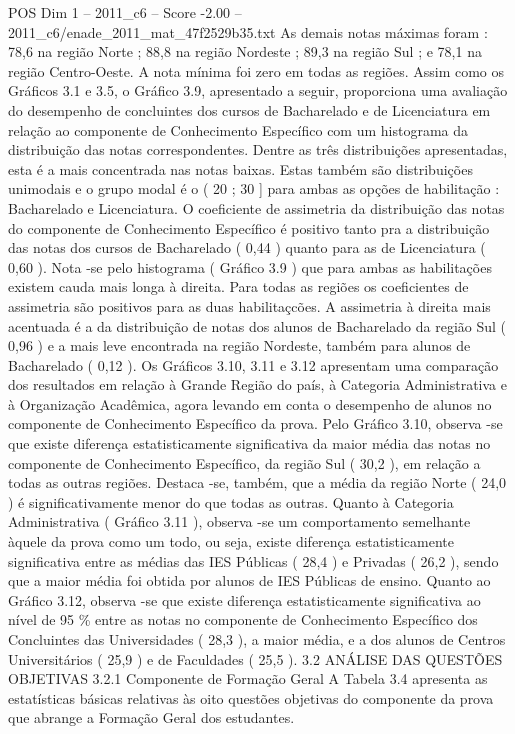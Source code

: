 \begin{textsample}{POS Dim 1 – 2011\_c6 – Score -2.00 – 2011\_c6/enade\_2011\_mat\_47f2529b35.txt}
As demais notas máximas foram : 78,6 na região Norte ; 88,8 na região Nordeste ; 89,3 na região Sul ; e 78,1 na região Centro-Oeste.
A nota mínima foi zero em todas as regiões.
Assim como os Gráficos 3.1 e 3.5, o Gráfico 3.9, apresentado a seguir, proporciona uma avaliação do desempenho de concluintes dos cursos de Bacharelado e de Licenciatura em relação ao componente de Conhecimento Específico com um histograma da distribuição das notas correspondentes.
Dentre as três distribuições apresentadas, esta é a mais concentrada nas notas baixas.
Estas também são distribuições unimodais e o grupo modal é o ( 20 ; 30 ] para ambas as opções de habilitação : Bacharelado e Licenciatura.
O coeficiente de assimetria da distribuição das notas do componente de Conhecimento Específico é positivo tanto pra a distribuição das notas dos cursos de Bacharelado ( 0,44 ) quanto para as de Licenciatura ( 0,60 ).
Nota -se pelo histograma ( Gráfico 3.9 ) que para ambas as habilitações existem cauda mais longa à direita.
Para todas as regiões os coeficientes de assimetria são positivos para as duas habilitaçcões.
A assimetria à direita mais acentuada é a da distribuição de notas dos alunos de Bacharelado da região Sul ( 0,96 ) e a mais leve encontrada na região Nordeste, também para alunos de Bacharelado ( 0,12 ).
Os Gráficos 3.10, 3.11 e 3.12 apresentam uma comparação dos resultados em relação à Grande Região do país, à Categoria Administrativa e à Organização Acadêmica, agora levando em conta o desempenho de alunos no componente de Conhecimento Específico da prova.
Pelo Gráfico 3.10, observa -se que existe diferença estatisticamente significativa da maior média das notas no componente de Conhecimento Específico, da região Sul ( 30,2 ), em relação a todas as outras regiões.
Destaca -se, também, que a média da região Norte ( 24,0 ) é significativamente menor do que todas as outras.
Quanto à Categoria Administrativa ( Gráfico 3.11 ), observa -se um comportamento semelhante àquele da prova como um todo, ou seja, existe diferença estatisticamente significativa entre as médias das IES Públicas ( 28,4 ) e Privadas ( 26,2 ), sendo que a maior média foi obtida por alunos de IES Públicas de ensino.
Quanto ao Gráfico 3.12, observa -se que existe diferença estatisticamente significativa ao nível de 95 \% entre as notas no componente de Conhecimento Específico dos Concluintes das Universidades ( 28,3 ), a maior média, e a dos alunos de Centros Universitários ( 25,9 ) e de Faculdades ( 25,5 ). 3.2 ANÁLISE DAS QUESTÕES OBJETIVAS 3.2.1 Componente de Formação Geral A Tabela 3.4 apresenta as estatísticas básicas relativas às oito questões objetivas do componente da prova que abrange a Formação Geral dos estudantes.

\end{textsample}
